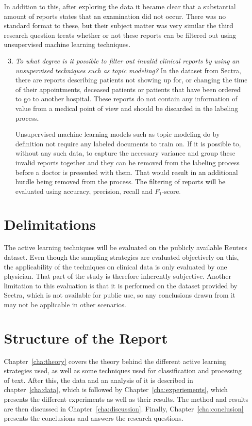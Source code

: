 In addition to this, after exploring the data it became clear that a substantial amount of reports states that an examination did not occur.
There was no standard format to these, but their subject matter was very similar the third research question treats whether or not these reports can be filtered out using unsupervised machine learning techniques.

\begin{enumerate}
      \setcounter{enumi}{2}
      \item \label{intro:re-q3}
      \textit{To what degree is it possible to filter out invalid clinical reports by using an unsupervised techniques such as topic modeling?}
      \newline
      In the dataset from Sectra, there are reports describing patients not showing up for, or changing the time of their appointments, deceased patients or patients that have been ordered to go to another hospital.
      These reports do not contain any information of value from a medical point of view and should be discarded in the labeling process.

      Unsupervised machine learning models such as topic modeling do by definition not require any labeled documents to train on.
      If it is possible to, without any such data, to capture the necessary variance and group these invalid reports together and they can be removed from the labeling process before a doctor is presented with them.
      That would result in an additional hurdle being removed from the process.
      The filtering of reports will be evaluated using  accuracy, precision, recall and $F_1$-score.
\end{enumerate}

\section{Delimitations}
\label{sec:delimitations}

The active learning techniques will be evaluated on the publicly available Reuters dataset.
Even though the sampling strategies are evaluated objectively on this, the applicability of the techniques on clinical data is only evaluated by one physician.
That part of the study is therefore inherently subjective.
Another limitation to this evaluation is that it is performed on the dataset provided by Sectra, which is not available for public use, so any conclusions drawn from it may not be applicable in other scenarios.

\section{Structure of the Report}
\label{sec:structure}

Chapter~\ref{cha:theory} covers the theory behind the different active learning strategies used, as well as some techniques used for classification and processing of text.
After this, the data and an analysis of it is described in chapter~\ref{cha:data}, which is followed by Chapter~\ref{cha:experiements}, which presents the different experiments as well as their results.
The method and results are then discussed in Chapter~\ref{cha:discussion}.
Finally, Chapter~\ref{cha:conclusion} presents the conclusions and answers the research questions.

